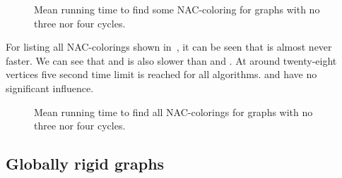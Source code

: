\begin{figure}[thbp]
	\centering
	\scalebox{\BenchFigureScale}{}
	\caption[Mean runtime for graphs with no 3 nor 4 cycles (some)]{
		Mean running time to find some NAC-coloring for graphs with no three nor four cycles.}%
	\label{fig:graph_count_no_3_nor_4_cycles_first_runtime}
\end{figure}%

For listing all NAC-colorings shown
in~,
it can be seen that \NaiveCycles{} is almost never faster.
We can see that \None{} and \CyclesMatchChunks{} is also slower than
\Neighbors{} and \NeighborsDegree{}.
At around twenty-eight vertices five second time limit is reached for all algorithms.
\MergeLinear{} and \SharedVertices{} have no significant influence.
%
\begin{figure}[thbp]
	\centering
	\scalebox{\BenchFigureScale}{}
	\caption[Mean runtime for graphs with no 3 nor 4 cycles (all)]{
		Mean running time to find all NAC-colorings for graphs with no three nor four cycles.}%
	\label{fig:graph_count_no_3_nor_4_cycles_all_runtime}
\end{figure}%


\subsection*{Globally rigid graphs}

